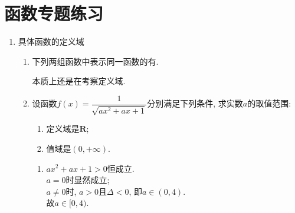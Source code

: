 \chapter*{函数专题练习}
\begin{enumerate}
\item 具体函数的定义域
\begin{enumerate}
    \item 下列两组函数中表示同一函数的有. \\
    \begin{jieda}
        本质上还是在考察定义域.
    \end{jieda}
    \item 设函数$f(x)=\dfrac{1}{\sqrt{ax^2+ax+1}}$分别满足下列条件, 求实数$a$的取值范围: 
    \begin{enumerate}
    \item 定义域是$\mathbf{R}$; 
    \item 值域是$(0,+\infty)$. 
    \end{enumerate}
    \begin{jieda}
        \begin{enumerate}
        \item $ax^2+ax+1>0$恒成立. \\
        $a=0$时显然成立; \\
        $a\neq 0$时, $a>0$且$ \Delta<0$, 即$a\in(0,4)$. \\
        故$a\in[0,4)$. 
        

\end{enumerate}
\end{jieda}
\end{enumerate}
\end{enumerate}
